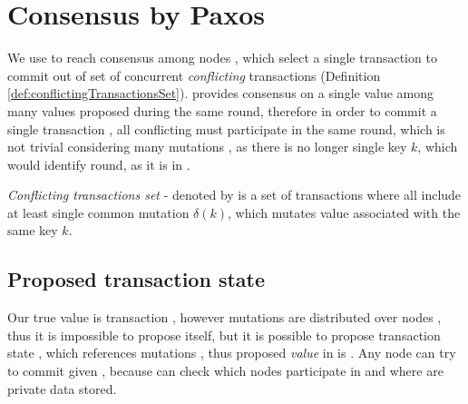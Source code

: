
\section{Consensus by Paxos}
We use \paxos to reach consensus among nodes \nodesTx, which select a single transaction \transaction to commit out of set of concurrent \emph{conflicting} transactions \transactions (Definition \ref{def:conflictingTransactionsSet}). \paxos provides consensus on a single value among many values proposed during the same \paxos round, therefore in order to commit a single transaction \transaction, all conflicting \transactions must participate in the same \paxos round, which is not trivial considering many mutations \mutationsFull, as there is no longer single key $k$, which would identify \paxos round, as it is in \lwt.

\begin{definition}
\label{def:conflictingTransactionsSet}
\emph{Conflicting transactions set} - denoted by \conflictingTxSet is a set of transactions where all \transactions include at least single common mutation $\delta(k)$, which mutates value associated with the same key $k$.
\end{definition}

\subsection{Proposed transaction state}
Our true value is transaction \transactionFull, however mutations \mutationsFull are distributed over nodes
\nodesOfMutations, thus it is impossible to propose \transaction itself, but it is possible to propose transaction
state \txState, which references mutations \mutations, thus proposed \paxos \emph{value} in \mpt is \txState. Any
node  can try to commit \transaction given \txState, because  can check which nodes participate in \transaction and where are private data stored.



